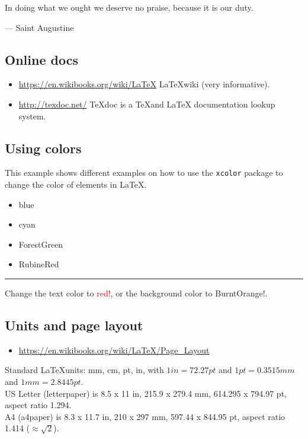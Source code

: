 \documentclass[letterpaper,dvipsnames]{article}
\begin{document}
\epigraph
{In doing what we ought we deserve no praise, because it is our duty.}
{--- \textup{Saint Augustine}}

\subsection{Online docs}
\begin{itemize}
    \item \url{https://en.wikibooks.org/wiki/LaTeX} 
          \LaTeX wiki (very informative).
    \item \url{http://texdoc.net/} TeXdoc is a \TeX and \LaTeX
          documentation lookup system.
\end{itemize}

\subsection{Using colors}
 
This example shows different examples on how to use the \texttt{xcolor} package 
to change the color of elements in \LaTeX.
 
\begin{itemize}
\color{blue}
    \item blue
\color{cyan}
    \item cyan
\color{ForestGreen}
    \item ForestGreen
\color{RubineRed}
    \item RubineRed
\end{itemize}
 
\begin{flushleft} \color{red} \rule{\linewidth}{1pt} \end{flushleft}

Change the text color to \textcolor{red}{red!}, or the background color to 
\colorbox{BurntOrange}{BurntOrange!}.

\subsection{Units and page layout}
\begin{itemize}
    \item \url{https://en.wikibooks.org/wiki/LaTeX/Page_Layout}
\end{itemize}
Standard \LaTeX units: mm, cm, pt, in, with $1in = 72.27pt$ and 
$1pt = 0.3515mm$ and $1mm = 2.8445pt$. \\
US Letter (letterpaper) is 8.5 x 11 in, 215.9 x 279.4 mm, 
614.295 x 794.97 pt, aspect ratio 1.294. \\
A4 (a4paper) is 8.3 x 11.7 in, 210 x 297 mm, 597.44 x 844.95 pt, aspect ratio 1.414 
($\approx\sqrt{2}$).
\end{document}

